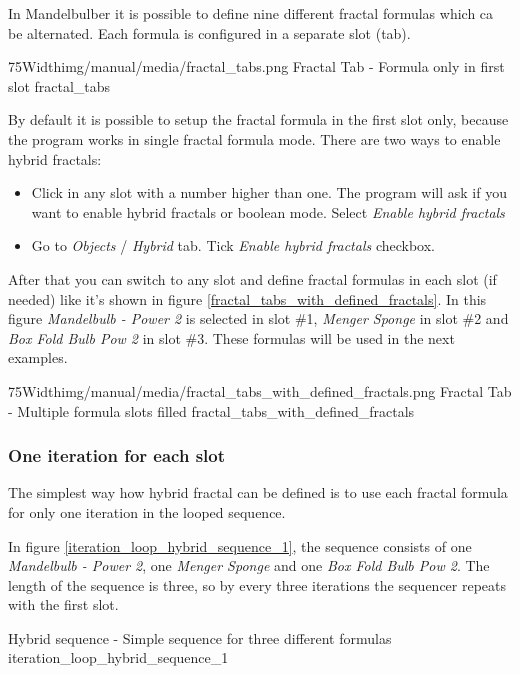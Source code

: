 In Mandelbulber it is possible to define nine different fractal formulas which
ca be alternated. Each formula is configured in a separate slot (tab).

\simpleImageWithCaption75Width{img/manual/media/fractal_tabs.png}
{Fractal Tab - Formula only in first slot}
{fractal_tabs}

By default it is possible to setup the fractal formula in the first slot only,
because the program works in single fractal formula mode. There are two ways to
enable hybrid fractals:
\begin{itemize}
	\item Click in any slot with a number higher than one. The program will ask if you want to
	      enable hybrid fractals or boolean mode. Select \emph{Enable hybrid fractals}
	\item Go to \emph{Objects} / \emph{Hybrid} tab. Tick \emph{Enable hybrid fractals} checkbox.
\end{itemize}

After that you can switch to any slot and define fractal formulas in each slot
(if needed) like it's shown in figure \ref{fractal_tabs_with_defined_fractals}.
In this figure \emph{Mandelbulb - Power 2} is selected in slot \#1, \emph{Menger Sponge}
in slot \#2 and \emph{Box Fold Bulb Pow 2} in slot \#3. These formulas will be
used in the next examples.

\simpleImageWithCaption75Width{img/manual/media/fractal_tabs_with_defined_fractals.png}
{Fractal Tab - Multiple formula slots filled}
{fractal_tabs_with_defined_fractals}

\subsubsection{One iteration for each slot}

The simplest way how hybrid fractal can be defined is to use each fractal
formula for only one iteration in the looped sequence.

In figure \ref{iteration_loop_hybrid_sequence_1}, the sequence consists of one \emph{Mandelbulb - Power 2}, one \emph{Menger Sponge} and
one \emph{Box Fold Bulb Pow 2}. The length of the sequence is three, so by every three
iterations the sequencer repeats with the first slot.

{Hybrid sequence - Simple sequence for three different formulas}
{iteration_loop_hybrid_sequence_1}

